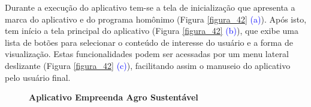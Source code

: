 Durante a execução do aplicativo tem-se a tela de inicialização que apresenta a marca do aplicativo e do programa homônimo (Figura \ref{figura_42} \textcolor{blue}{(a)}). Após isto, tem início a tela principal do aplicativo (Figura \ref{figura_42} \textcolor{blue}{(b)}), que exibe uma lista de botões para selecionar o conteúdo de interesse do usuário e a forma de visualização. Estas funcionalidades podem ser acessadas por um menu lateral deslizante (Figura \ref{figura_42} \textcolor{blue}{(c)}), facilitando assim o manuseio do aplicativo pelo usuário final. 



\begin{figure}[H]
\FloatBarrier
\center
\caption{\textbf{Aplicativo Empreenda Agro Sustentável}}

\end{figure}
